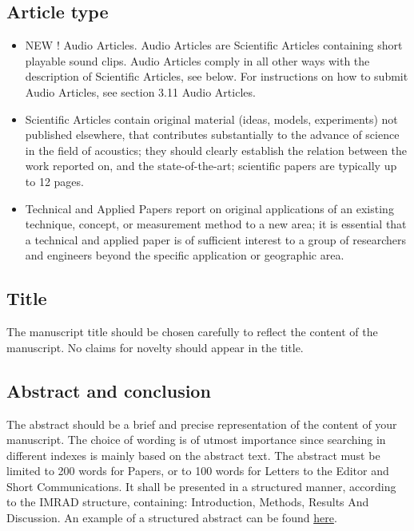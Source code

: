 \subsection{Article type }
\begin{itemize}
\item NEW ! Audio Articles. Audio Articles are Scientific Articles containing
short playable sound clips. Audio Articles comply in all other ways
with the description of Scientific Articles, see below. For instructions
on how to submit Audio Articles, see section 3.11 Audio Articles. 
\item Scientific Articles contain original material (ideas, models, experiments)
not published elsewhere, that contributes substantially to the advance
of science in the field of acoustics; they should clearly establish
the relation between the work reported on, and the state-of-the-art;
scientific papers are typically up to 12 pages. 
\item Technical and Applied Papers report on original applications of an
existing technique, concept, or measurement method to a new area;
it is essential that a technical and applied paper is of sufficient
interest to a group of researchers and engineers beyond the specific
application or geographic area. 
\end{itemize}

\subsection{Title }

The manuscript title should be chosen carefully to reflect the content
of the manuscript. No claims for novelty should appear in the title.

\subsection{Abstract and conclusion }

The abstract should be a brief and precise representation of the content
of your manuscript. The choice of wording is of utmost importance
since searching in different indexes is mainly based on the abstract
text. The abstract must be limited to 200 words for Papers, or to
100 words for Letters to the Editor and Short Communications. It shall
be presented in a structured manner, according to the IMRAD structure,
containing: Introduction, Methods, Results And Discussion. An example
of a structured abstract can be found \href{https://www.4open-sciences.org/articles/fopen/abs/2018/01/fopen180003/fopen180003.html}{here}.\\

